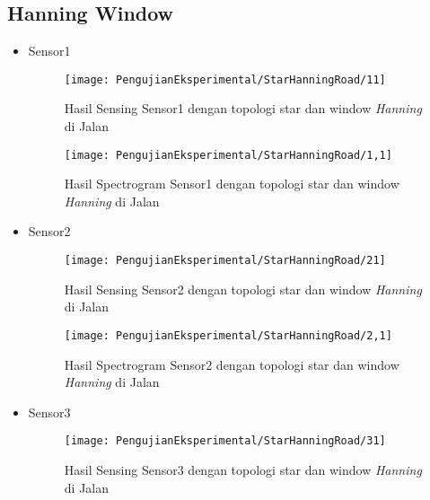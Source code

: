 \subsection{Hanning Window}
\begin{itemize}
\item Sensor1
\begin{figure}[H]
	\centering
	\texttt{[image: PengujianEksperimental/StarHanningRoad/11]}
	\caption[Hasil Sensing Sensor1 dengan topologi star dan window {\it Hanning} di Jalan]{Hasil Sensing Sensor1 dengan topologi star dan window {\it Hanning} di Jalan} 
	\label{fig:hasilJalanStarHann11}
\end{figure}

\begin{figure}[H]
	\centering
	\texttt{[image: PengujianEksperimental/StarHanningRoad/1,1]}
	\caption[Hasil Spectrogram Sensor1 dengan topologi star dan window {\it Hanning} di Jalan]{Hasil Spectrogram Sensor1 dengan topologi star dan window {\it Hanning} di Jalan} 
	\label{fig:hasilJalanStarHann1,1}
\end{figure}

\item Sensor2
\begin{figure}[H]
	\centering
	\texttt{[image: PengujianEksperimental/StarHanningRoad/21]}
	\caption[Hasil Sensing Sensor2 dengan topologi star dan window {\it Hanning} di Jalan]{Hasil Sensing Sensor2 dengan topologi star dan window {\it Hanning} di Jalan} 
	\label{fig:hasilJalanStarHann21}
\end{figure}

\begin{figure}[H]
	\centering
	\texttt{[image: PengujianEksperimental/StarHanningRoad/2,1]}
	\caption[Hasil Spectrogram Sensor2 dengan topologi star dan window {\it Hanning} di Jalan]{Hasil Spectrogram Sensor2 dengan topologi star dan window {\it Hanning} di Jalan} 
	\label{fig:hasilJalanStarHann2,1}
\end{figure}

\item Sensor3
\begin{figure}[H]
	\centering
	\texttt{[image: PengujianEksperimental/StarHanningRoad/31]}
	\caption[Hasil Sensing Sensor3 dengan topologi star dan window {\it Hanning} di Jalan]{Hasil Sensing Sensor3 dengan topologi star dan window {\it Hanning} di Jalan} 
	\label{fig:hasilJalanStarHann31}
\end{figure}


\end{itemize}
